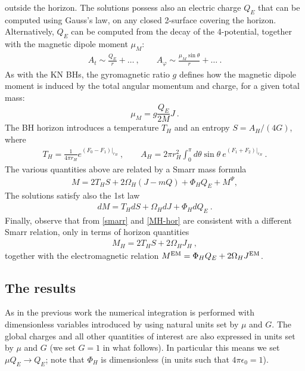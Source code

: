 \documentclass{article}
\begin{document}
outside the horizon.  
The solutions possess also an electric charge $Q_E$ that can be computed using Gauss's law, 
on any closed 2-surface covering the horizon. 
Alternatively, $Q_E$ can be computed from the decay of the 4-potential, together with the magnetic dipole moment $\mu_M$:
%
 \begin{eqnarray}
 \label{asym-matter-fields}
A_t\sim 
\frac{Q_E}{r}+\dots \ , \qquad A_{\varphi}\sim \frac{\mu_M \sin \theta}{r}+\dots\
 .
 \end{eqnarray}
As with the KN BHs, the gyromagnetic ratio $g$ defines how the magnetic dipole moment 
is induced by the total angular momentum and charge, for a given total mass:
 \begin{equation}
 \mu_M=g\frac{Q_E}{2M}J \ .
 \label{gyro}
 \end{equation}
The BH horizon introduces a temperature $T_H$ and an entropy $S={A_H}/({4G})$,
where 
%
\begin{eqnarray}
\label{THAH}
T_H=\frac{1}{4\pi r_H}e^{(F_0-F_1)|_{r_H}}\ ,
\qquad
A_H=2\pi r_H^2 \int_0^\pi d\theta \sin \theta~e^{(F_1+F_2)|_{r_H}} \ .
\end{eqnarray}
%
The various quantities above are related by a Smarr mass formula 
%
\begin{eqnarray}
\label{smarr}
M=2 T_H S +2\Omega_H (J-m Q) + \Phi_H Q_E+ M^\Psi,
\end{eqnarray}
The solutions satisfy also the 1st law 
%
\begin{eqnarray}
\label{first-law}
dM=T_H dS +\Omega_H dJ + \Phi_H dQ_E\ .
\end{eqnarray}
%
Finally, observe that from \eqref{smarr} and \eqref{MH-hor} are consistent with a different Smarr relation, only in terms of horizon quantities  
%
%
\begin{eqnarray} 
\label{rel-hor}
M_H=2T_H S+2 \Omega_H J_H~,
\end{eqnarray}
together with the electromagnetic relation $M^{\rm EM}=\Phi_HQ_E+2\Omega_HJ^{\rm EM}$.




\subsection{The results }
\label{sec_results_u}
As in the previous work \cite{Herdeiro:2015gia,Herdeiro:2016tmi}
the numerical integration is performed with 
dimensionless variables introduced by using natural units set by $\mu$ and $G$.
The global charges and all other quantities of interest are also
 expressed in units set by $\mu$ and $G$ 
(we set $G=1$ in what follows). 
In particular this means we set $\mu Q_E\rightarrow Q_E$; 
note that $\Phi_H$ is dimensionless (in units such that $4\pi \epsilon_0=1$). 
\end{document}
